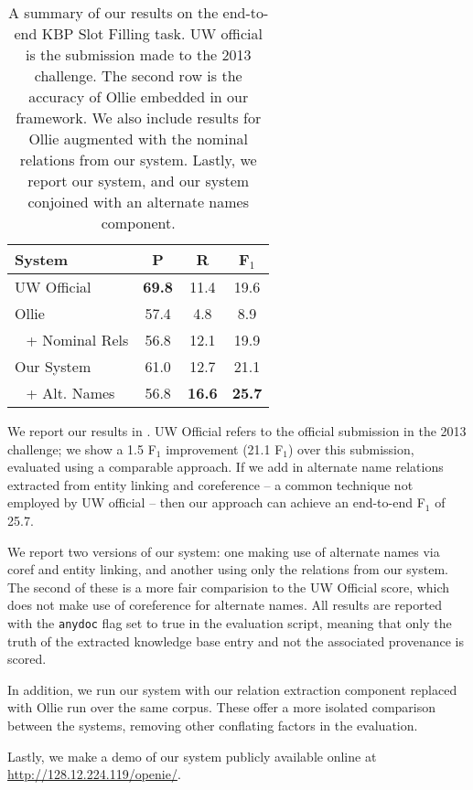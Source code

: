 \begin{table}
\begin{center}
\begin{tabular}{l|cc:c}
\textbf{System} & \textbf{P} & \textbf{R} & \textbf{F$_1$} \\
\hline
UW Official          & \textbf{69.8} & 11.4 & 19.6 \\
Ollie                & 57.4 & 4.8   & 8.9  \\
$~~$ + Nominal Rels  & 56.8 & 12.1  & 19.9 \\
\hline
Our System           & 61.0 & 12.7  & 21.1 \\
$~~$ + Alt. Names    & 56.8 & \textbf{16.6} & \textbf{25.7} \\
\end{tabular}
\end{center}
\caption{\label{tab:results}
A summary of our results on the end-to-end KBP Slot Filling task.
UW official is the submission made to the 2013 challenge.
The second row is the accuracy of Ollie embedded in our framework.
We also include results for Ollie augmented with the nominal 
  relations from our system.
Lastly, we report our system, and our system conjoined with an
  alternate names component.
}
\end{table}

We report our results in .
UW Official refers to the official submission in the 2013 challenge;
  we show a 1.5 F$_1$ improvement (21.1 F$_1$) over this submission, 
  evaluated using a comparable approach.
If we add in alternate name relations extracted from entity linking and
  coreference -- a common technique not employed by UW official -- then
  our approach can achieve an end-to-end F$_1$ of 25.7.


We report two versions of our system: one making use of alternate names
  via coref and entity linking, and another using only the relations from
  our system.
The second of these is a more fair comparision to the UW Official score,
  which does not make use of coreference for alternate names.
All results are reported with the \texttt{anydoc} flag set to true
  in the evaluation script, meaning that only the truth of the extracted
  knowledge base entry and not the associated provenance is scored.

In addition, we run our system with our relation extraction component replaced
  with Ollie \cite{key:2012mausam-ollie} run over the same corpus.
These offer a more isolated comparison between the systems, removing
  other conflating factors in the evaluation.

Lastly, we make a demo of our system publicly available online at
  \url{http://128.12.224.119/openie/}.
